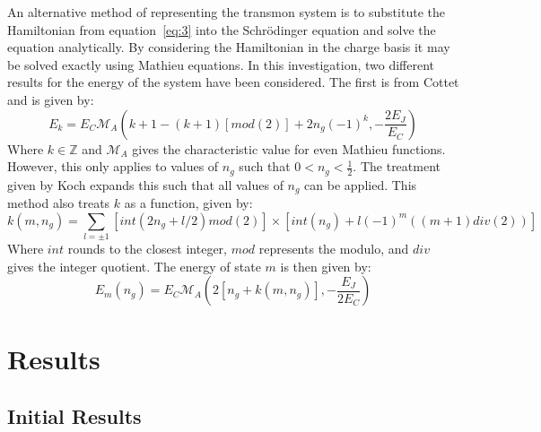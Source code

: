 \documentclass[11pt]{article}
\begin{document}
An alternative method of representing the transmon system is to substitute the Hamiltonian from equation~\ref{eq:3} into the Schr\"odinger equation and solve the equation analytically.
By considering the Hamiltonian in the charge basis it may be solved exactly using Mathieu equations. In this investigation, two different results for the energy of the system have been considered. The first is from Cottet and is given by:
\begin{equation} \label{eq:7}
E_k = E_C \mathcal{M}_A (k+1 - (k+1)[mod(2)] + 2n_g(-1)^k, -\frac{2E_J}{E_C})
\end{equation}
Where $k \in \mathbb{Z}$ and $\mathcal{M}_A$ gives the characteristic value for even Mathieu functions. However, this only applies to values of $n_g$ such that $0 < n_g < \frac{1}{2}$. The treatment given by Koch expands this such that all values of $n_g$ can be applied. This method also treats $k$ as a function, given by:
\begin{equation} \label{eq:8}
k(m, n_g) = \sum_{l=\pm 1} [int(2n_g + l/2)mod(2)] \times [int(n_g) + l(-1)^m ((m+1)div(2))]
\end{equation}
Where $int$ rounds to the closest integer, $mod$ represents the modulo, and $div$ gives the integer quotient.  The energy of state $m$ is then given by:
\begin{equation} \label{eq:9}
E_m(n_g) = E_C \mathcal{M}_A (2[n_g + k(m,n_g)],-\frac{E_J}{2E_C})
\end{equation}


\section{Results}
\subsection{Initial Results}
\end{document}
